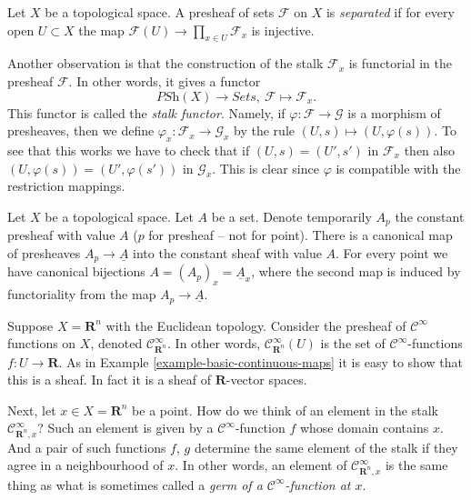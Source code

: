 \begin{definition}
\label{definition-separated}
Let $X$ be a topological space.
A presheaf of sets $\mathcal{F}$ on $X$ is {\it separated}
if for every open $U \subset X$ the map
$\mathcal{F}(U) \to \prod_{x \in U} \mathcal{F}_x$ is
injective.
\end{definition}

\noindent
Another observation is that the construction of the stalk
$\mathcal{F}_x$ is functorial in the presheaf $\mathcal{F}$.
In other words, it gives a functor
$$
\textit{PSh}(X) \longrightarrow \textit{Sets},
\ \mathcal{F} \longmapsto \mathcal{F}_x.
$$
This functor is called the {\it stalk functor}.
Namely, if $\varphi : \mathcal{F} \to \mathcal{G}$ is
a morphism of presheaves, then we define
$\varphi_x : \mathcal{F}_x \to \mathcal{G}_x$
by the rule $(U, s) \mapsto (U, \varphi(s))$.
To see that this works we have to check that
if $(U, s) = (U', s')$ in $\mathcal{F}_x$ then also
$(U, \varphi(s)) = (U', \varphi(s'))$ in $\mathcal{G}_x$.
This is clear since $\varphi$ is compatible with the
restriction mappings.

\begin{example}
\label{example-stalk-constant-presheaf}
Let $X$ be a topological space. Let $A$ be a set.
Denote temporarily $A_p$ the constant presheaf
with value $A$ ($p$ for presheaf -- not for point).
There is a canonical map of presheaves
$A_p \to \underline{A}$ into the constant sheaf with
value $A$. For every point we have canonical
bijections $A = (A_p)_x = \underline{A}_x$, where
the second map is induced by functoriality from
the map $A_p \to \underline{A}$.
\end{example}



\begin{example}
\label{example-germs-functions}
Suppose $X = \mathbf{R}^n$ with the Euclidean topology.
Consider the presheaf of $\mathcal{C}^\infty$ functions
on $X$, denoted $\mathcal{C}^\infty_{\mathbf{R}^n}$.
In other words, $\mathcal{C}^\infty_{\mathbf{R}^n}(U)$ is the set
of $\mathcal{C}^\infty$-functions $f : U \to \mathbf{R}$.
As in Example \ref{example-basic-continuous-maps}
it is easy to show that this is a sheaf. In fact it
is a sheaf of $\mathbf{R}$-vector spaces.

\medskip\noindent
Next, let $x \in X = \mathbf{R}^n$ be a point. How do
we think of an element in the stalk $\mathcal{C}^\infty_{\mathbf{R}^n, x}$?
Such an element is given by a $\mathcal{C}^\infty$-function
$f$ whose domain contains $x$. And a pair of such
functions $f$, $g$ determine
the same element of the stalk if they agree in a neighbourhood
of $x$. In other words, an element of $\mathcal{C}^\infty_{\mathbf{R}^n, x}$
is the same thing as what is sometimes called
a {\it germ of a $\mathcal{C}^\infty$-function at $x$}.
\end{example}


